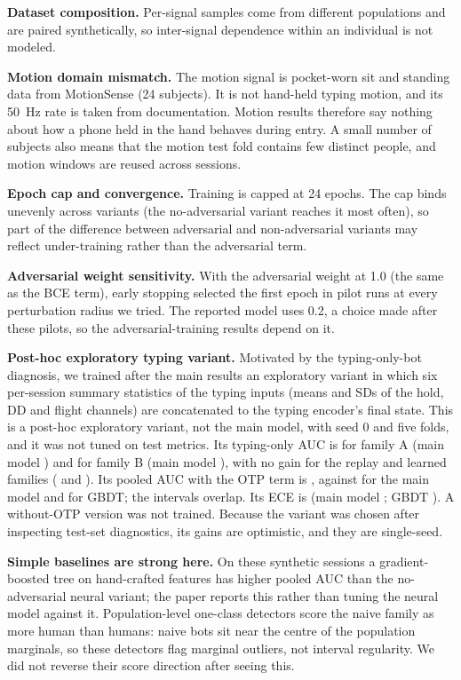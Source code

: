 \documentclass[conference]{IEEEtran}
\begin{document}
\textbf{Dataset composition.} Per-signal samples come from different populations and are paired synthetically, so inter-signal dependence within an individual is not modeled.

\textbf{Motion domain mismatch.} The motion signal is pocket-worn sit and standing data from MotionSense (24 subjects). It is not hand-held typing motion, and its 50~Hz rate is taken from documentation. Motion results therefore say nothing about how a phone held in the hand behaves during entry. A small number of subjects also means that the motion test fold contains few distinct people, and motion windows are reused across sessions.

\textbf{Epoch cap and convergence.} Training is capped at 24 epochs. The cap binds unevenly across variants (the no-adversarial variant reaches it most often), so part of the difference between adversarial and non-adversarial variants may reflect under-training rather than the adversarial term.

\textbf{Adversarial weight sensitivity.} With the adversarial weight at 1.0 (the same as the BCE term), early stopping selected the first epoch in pilot runs at every perturbation radius we tried. The reported model uses 0.2, a choice made after these pilots, so the adversarial-training results depend on it.

\textbf{Post-hoc exploratory typing variant.} Motivated by the typing-only-bot diagnosis, we trained after the main results an exploratory variant in which six per-session summary statistics of the typing inputs (means and SDs of the hold, DD and flight channels) are concatenated to the typing encoder's final state. This is a post-hoc exploratory variant, not the main model, with seed 0 and five folds, and it was not tuned on test metrics. Its typing-only AUC is \TsFamA{} for family A (main model \OrigFamA{}) and \TsFamB{} for family B (main model \OrigFamB{}), with no gain for the replay and learned families (\TsFamC{} and \TsFamD{}). Its pooled AUC with the OTP term is \TsPooled{}, against \OrigPooledAucP{} for the main model and \GbtPooledAucP{} for GBDT; the intervals overlap. Its ECE is \TsEce{} (main model \OrigPooledEce{}; GBDT \GbtPooledEce{}). A without-OTP version was not trained. Because the variant was chosen after inspecting test-set diagnostics, its gains are optimistic, and they are single-seed.

\textbf{Simple baselines are strong here.} On these synthetic sessions a gradient-boosted tree on hand-crafted features has higher pooled AUC than the no-adversarial neural variant; the paper reports this rather than tuning the neural model against it. Population-level one-class detectors score the naive family as more human than humans: naive bots sit near the centre of the population marginals, so these detectors flag marginal outliers, not interval regularity. We did not reverse their score direction after seeing this.
\end{document}
